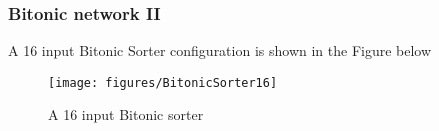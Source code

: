 \begin{frame}[shrink=15]
\frametitle{Bitonic network II}
  A 16 input Bitonic Sorter configuration is shown in the Figure below 
 \begin{figure}[!ht]
 \texttt{[image: figures/BitonicSorter16]}
 \caption{A 16 input Bitonic sorter}
 \end{figure}
\end{frame}
